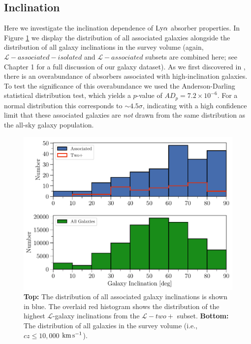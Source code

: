 \documentclass[twocolumn,tighten]{aastex62}
\newcommand{\kms}{$\rm km\, s^{-1}$}
\begin{document}
\subsection{Inclination}

Here we investigate the inclination dependence of $\rm Ly\alpha$ absorber properties. In Figure \ref{inc_hist} we display the distribution of all associated galaxies alongside the distribution of all galaxy inclinations in the survey volume (again, $\mathcal{L}-associated-isolated$ and $\mathcal{L}-associated$ subsets are combined here; see Chapter 1 for a full discussion of our galaxy dataset). As we first discovered in \cite{french2017}, there is an overabundance of absorbers associated with high-inclination galaxies. To test the significance of this overabundance we used the Anderson-Darling statistical distribution test, which yields a $p$-value of $AD_p = 7.2 \times 10^{-6}$. For a normal distribution this corresponds to $\sim 4.5 \sigma$, indicating with a high confidence limit that these associated galaxies are \emph{not} drawn from the same distribution as the all-sky galaxy population.

\begin{figure}
\centering
  \includegraphics[width=0.99\linewidth]{hist(adjustedInc)_associated_group_all_overlaid_double.pdf}
  \caption{\small{\textbf{Top:} The distribution of all associated galaxy inclinations is shown in blue. The overlaid red histogram shows the distribution of the highest $\mathcal{L}$-galaxy inclinations from the $\mathcal{L}-two+$ subset. \textbf{Bottom:} The distribution of all galaxies in the survey volume (i.e., $cz \leq 10,000$ \kms).}}
\label{inc_hist}
\vspace{0pt}
\end{figure}
\end{document}
